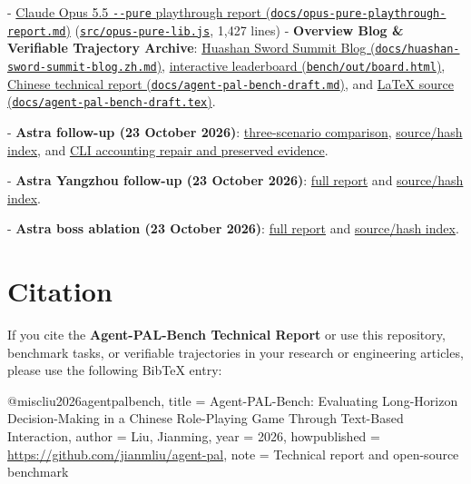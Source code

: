 \documentclass[11pt,a4paper]{article}
\begin{document}
  - \href{./opus-pure-playthrough-report.md}{Claude Opus 5.5 \texttt{-\allowbreak{}-\allowbreak{}pure} playthrough report (\texttt{docs\allowbreak{}/\allowbreak{}opus\allowbreak{}-\allowbreak{}pure\allowbreak{}-\allowbreak{}playthro\allowbreak{}ugh\allowbreak{}-\allowbreak{}report\allowbreak{}.\allowbreak{}md})} (\href{../src/opus-pure-lib.js}{\texttt{src\allowbreak{}/\allowbreak{}opus\allowbreak{}-\allowbreak{}pure\allowbreak{}-\allowbreak{}lib\allowbreak{}.\allowbreak{}js}}, 1,427 lines)
- \textbf{Overview Blog \& Verifiable Trajectory Archive}: \href{./huashan-sword-summit-blog.zh.md}{Huashan Sword Summit Blog (\texttt{docs\allowbreak{}/\allowbreak{}huashan\allowbreak{}-\allowbreak{}sword\allowbreak{}-\allowbreak{}summit\allowbreak{}-\allowbreak{}blog\allowbreak{}.\allowbreak{}zh\allowbreak{}.\allowbreak{}md})}, \href{../bench/out/board.html}{interactive leaderboard (\texttt{bench\allowbreak{}/\allowbreak{}out\allowbreak{}/\allowbreak{}board\allowbreak{}.\allowbreak{}html})}, \href{./agent-pal-bench-draft.md}{Chinese technical report (\texttt{docs\allowbreak{}/\allowbreak{}agent\allowbreak{}-\allowbreak{}pal\allowbreak{}-\allowbreak{}bench\allowbreak{}-\allowbreak{}draft\allowbreak{}.\allowbreak{}md})}, and \href{./agent-pal-bench-draft.tex}{LaTeX source (\texttt{docs\allowbreak{}/\allowbreak{}agent\allowbreak{}-\allowbreak{}pal\allowbreak{}-\allowbreak{}bench\allowbreak{}-\allowbreak{}draft\allowbreak{}.\allowbreak{}tex})}.

- \textbf{Astra follow-up (23 October 2026)}: \href{astra-three-scenario-evaluation-2026-10-23.md}{three-scenario comparison}, \href{astra-three-scenario-evaluation-2026-10-23.evidence.json}{source/hash index}, and \href{cli-accounting-repair-2026-10-23.md}{CLI accounting repair and preserved evidence}.

- \textbf{Astra Yangzhou follow-up (23 October 2026)}: \href{astra-yangzhou-gourd-2026-10-23.md}{full report} and \href{astra-yangzhou-gourd-2026-10-23.evidence.json}{source/hash index}.

- \textbf{Astra boss ablation (23 October 2026)}: \href{astra-baiyue-ablation-2026-10-23.md}{full report} and \href{astra-baiyue-ablation-2026-10-23.evidence.json}{source/hash index}.

\section{\texorpdfstring{Citation}{Citation}}

If you cite the \textbf{Agent-PAL-Bench Technical Report} or use this repository, benchmark tasks, or verifiable trajectories in your research or engineering articles, please use the following BibTeX entry:

\begin{CodeBlock}
@misc{liu2026agentpalbench,
  title        = {Agent-PAL-Bench: Evaluating Long-Horizon Decision-Making in a Chinese Role-Playing Game Through Text-Based Interaction},
  author       = {Liu, Jianming},
  year         = {2026},
  howpublished = {\url{https://github.com/jianmliu/agent-pal}},
  note         = {Technical report and open-source benchmark}
}
\end{CodeBlock}
\end{document}
